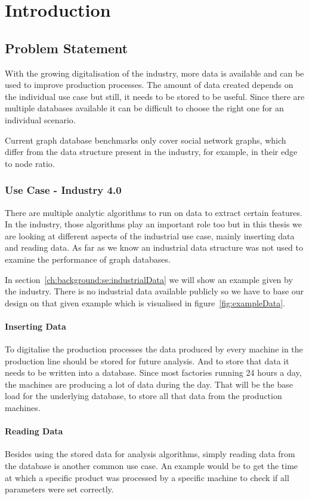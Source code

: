 \chapter{Introduction}
\label{ch:introduction}

\section{Problem Statement}
With the growing digitalisation of the industry,
more data is available and can be used to improve production processes.
The amount of data created depends on the individual use case but still,
it needs to be stored to be useful.
Since there are multiple databases available it can be difficult to choose the right one for an individual scenario.

Current graph database benchmarks only cover social network graphs,
which differ from the data structure present in the industry,
for example,
in their edge to node ratio.

\subsection{Use Case - Industry 4.0}
There are multiple analytic algorithms to run on data to extract certain features.
In the industry,
those algorithms play an important role too but in this thesis we are looking at different aspects of the industrial use case,
mainly inserting data and reading data.
As far as we know an industrial data structure was not used to examine the performance of graph databases.

In section~\ref{ch:background:se:industrialData} we will show an example given by the industry.
There is no industrial data available publicly so we have to base our design on that given example which is visualised in figure~\ref{fig:exampleData}.

\subsubsection{Inserting Data}
To digitalise the production processes the data produced by every machine in the production line should be stored for future analysis.
And to store that data it needs to be written into a database.
Since most factories running 24 hours a day,
the machines are producing a lot of data during the day.
That will be the base load for the underlying database, to store all that data from the production machines.

\subsubsection{Reading Data}
Besides using the stored data for analysis algorithms,
simply reading data from the database is another common use case.
An example would be to get the time at which a specific product was processed by a specific machine to check if all parameters were set correctly.

